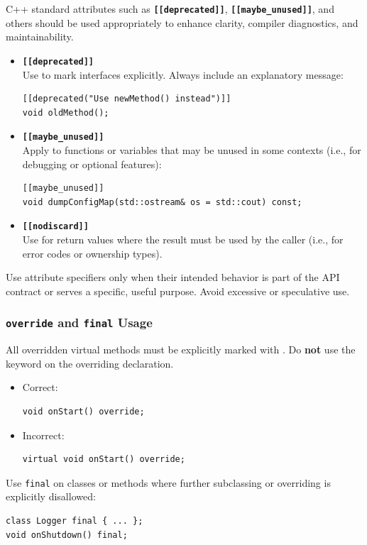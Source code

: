 C++ standard attributes such as \texttt{\textbf{[[deprecated]]}}, \texttt{\textbf{[[maybe\_unused]]}}, and others should be used appropriately to enhance clarity, compiler diagnostics, and maintainability.
\begin{itemize}\itemsep0em
  \item \textbf{\texttt{[[deprecated]]}} \\
  Use to mark  interfaces explicitly. Always include an explanatory message:
  \begin{lstlisting}[style=cppstyle]
[[deprecated("Use newMethod() instead")]]
void oldMethod();
  \end{lstlisting}

  \item \textbf{\texttt{[[maybe\_unused]]}} \\
  Apply to functions or variables that may be unused in some contexts (i.e., for debugging or optional features):
  \begin{lstlisting}[style=cppstyle]
[[maybe_unused]]
void dumpConfigMap(std::ostream& os = std::cout) const;
  \end{lstlisting}

  \item \textbf{\texttt{[[nodiscard]]}} \\
  Use for return values where the result must be used by the caller (i.e., for error codes or ownership types).
\end{itemize}
Use attribute specifiers only when their intended behavior is part of the API contract or serves a specific, useful purpose. Avoid excessive or speculative use.

\subsubsection*{\texttt{override} and \texttt{final} Usage}

All overridden virtual methods must be explicitly marked with . Do \textbf{not} use the  keyword on the overriding declaration.
\begin{itemize}\itemsep0em
  \item Correct:
  \begin{lstlisting}[style=cppstyle]
void onStart() override;
  \end{lstlisting}
  \item Incorrect:
  \begin{lstlisting}[style=cppstyle]
virtual void onStart() override;
  \end{lstlisting}
\end{itemize}
Use \texttt{final} on classes or methods where further subclassing or overriding is explicitly disallowed:
\begin{lstlisting}[style=cppstyle]
class Logger final { ... };
void onShutdown() final;
\end{lstlisting}










